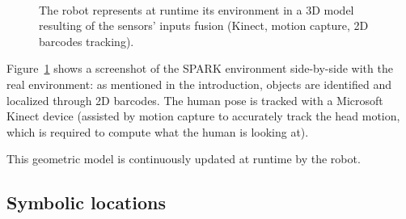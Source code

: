 \documentclass{svmult}
\begin{document}
\begin{figure}[ht!]
   \begin{center}
%
       \\ %
%
   \end{center}

   \caption{The robot represents at runtime its environment in a 3D model
   resulting of the sensors' inputs fusion (Kinect, motion capture, 2D barcodes
   tracking).}

   \label{fig|spark}

\end{figure}

Figure~\ref{fig|spark} shows a screenshot of the SPARK environment side-by-side
with the real environment: as mentioned in the introduction, objects are
identified and localized through 2D barcodes. The human pose is tracked with
a Microsoft Kinect device (assisted by motion capture to accurately track the
head motion, which is required to compute what the human is looking at).

This geometric model is continuously updated at runtime by the robot.

\subsection{Symbolic locations}
\end{document}
